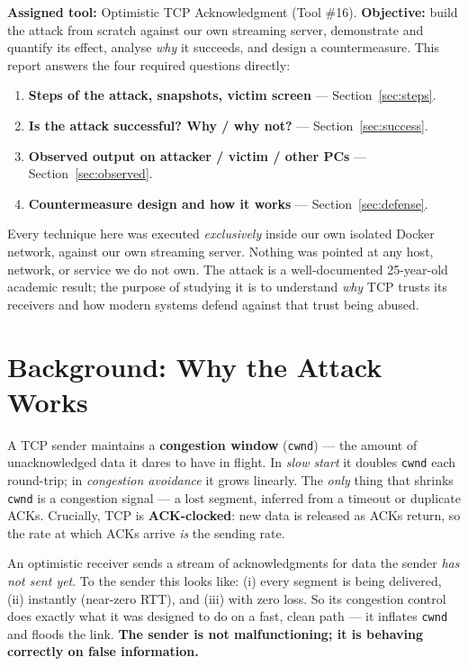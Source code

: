\documentclass[11pt,a4paper]{article}
\begin{document}
\textbf{Assigned tool:} Optimistic TCP Acknowledgment (Tool \#16). \textbf{Objective:}
build the attack from scratch against our own streaming server, demonstrate and quantify
its effect, analyse \emph{why} it succeeds, and design a countermeasure. This report
answers the four required questions directly:

\begin{enumerate}[label=\textbf{(\alph*)}]
  \item \textbf{Steps of the attack, snapshots, victim screen} --- Section~\ref{sec:steps}.
  \item \textbf{Is the attack successful? Why / why not?} --- Section~\ref{sec:success}.
  \item \textbf{Observed output on attacker / victim / other PCs} --- Section~\ref{sec:observed}.
  \item \textbf{Countermeasure design and how it works} --- Section~\ref{sec:defense}.
\end{enumerate}

\begin{notebox}
Every technique here was executed \emph{exclusively} inside our own isolated Docker
network, against our own streaming server. Nothing was pointed at any host, network, or
service we do not own. The attack is a well-documented 25-year-old academic result; the
purpose of studying it is to understand \emph{why} TCP trusts its receivers and how modern
systems defend against that trust being abused.
\end{notebox}

\section{Background: Why the Attack Works}

A TCP sender maintains a \textbf{congestion window} (\texttt{cwnd}) --- the amount of
unacknowledged data it dares to have in flight. In \emph{slow start} it doubles
\texttt{cwnd} each round-trip; in \emph{congestion avoidance} it grows linearly. The
\emph{only} thing that shrinks \texttt{cwnd} is a congestion signal --- a lost segment,
inferred from a timeout or duplicate ACKs. Crucially, TCP is \textbf{ACK-clocked}: new
data is released as ACKs return, so the rate at which ACKs arrive \emph{is} the sending
rate.

\begin{keybox}
An optimistic receiver sends a stream of acknowledgments for data the sender
\emph{has not sent yet}. To the sender this looks like: (i) every segment is being
delivered, (ii) instantly (near-zero RTT), and (iii) with zero loss. So its congestion
control does exactly what it was designed to do on a fast, clean path --- it inflates
\texttt{cwnd} and floods the link. \textbf{The sender is not malfunctioning; it is
behaving correctly on false information.}
\end{keybox}
\end{document}
